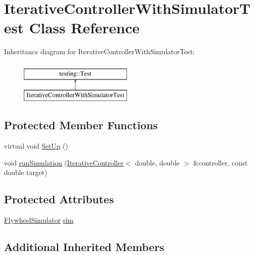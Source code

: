 \hypertarget{classIterativeControllerWithSimulatorTest}{}\section{Iterative\+Controller\+With\+Simulator\+Test Class Reference}
\label{classIterativeControllerWithSimulatorTest}
Inheritance diagram for Iterative\+Controller\+With\+Simulator\+Test\+:\begin{figure}[H]
\begin{center}
\leavevmode
\includegraphics[height=2.000000cm]{classIterativeControllerWithSimulatorTest}
\end{center}
\end{figure}
\subsection*{Protected Member Functions}
\begin{DoxyCompactItemize}
\item 
virtual void \mbox{\hyperlink{classIterativeControllerWithSimulatorTest_af79613c99a52d765087216edbf4c9d59}{Set\+Up}} ()
\item 
void \mbox{\hyperlink{classIterativeControllerWithSimulatorTest_a963a8dbc0e4c01b83a7372766be2f111}{run\+Simulation}} (\mbox{\hyperlink{classokapi_1_1IterativeController}{Iterative\+Controller}}$<$ double, double $>$ \&controller, const double target)
\end{DoxyCompactItemize}
\subsection*{Protected Attributes}
\begin{DoxyCompactItemize}
\item 
\mbox{\hyperlink{classokapi_1_1FlywheelSimulator}{Flywheel\+Simulator}} \mbox{\hyperlink{classIterativeControllerWithSimulatorTest_ac1ee29525f6b291fed101f83733712b4}{sim}}
\end{DoxyCompactItemize}
\subsection*{Additional Inherited Members}


